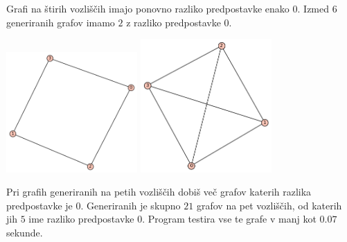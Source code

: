 \documentclass[10pt, a4paper]{article}
\begin{document}
Grafi na štirih vozliščih imajo ponovno razliko predpostavke enako $0$. Izmed $6$ generiranih grafov imamo $2$ z razliko predpostavke $0$.

\includegraphics[width=5cm]{min_graf_4.1}
\includegraphics[width=5cm]{min_graf_4.2}

Pri grafih generiranih na petih vozliščih dobiš več grafov katerih razlika predpostavke je $0$. Generiranih je skupno $21$ grafov na pet vozliščih, od katerih jih $5$ ime razliko predpostavke $0$. Program testira vse te grafe v manj kot $0.07$ sekunde.
\end{document}
